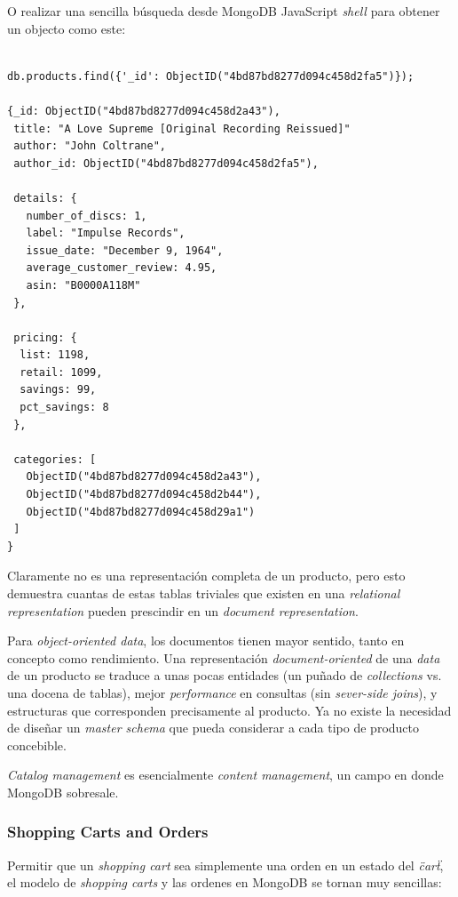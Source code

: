 O realizar una sencilla búsqueda desde MongoDB JavaScript \textit{shell} para obtener un objecto  como este:

\medskip
\begin{lstlisting}[caption= Busqueda en MongoDB]

db.products.find({'_id': ObjectID("4bd87bd8277d094c458d2fa5")});

{_id: ObjectID("4bd87bd8277d094c458d2a43"),
 title: "A Love Supreme [Original Recording Reissued]"
 author: "John Coltrane",
 author_id: ObjectID("4bd87bd8277d094c458d2fa5"),

 details: {
   number_of_discs: 1,
   label: "Impulse Records",
   issue_date: "December 9, 1964",
   average_customer_review: 4.95,
   asin: "B0000A118M"
 },

 pricing: {
  list: 1198,
  retail: 1099,
  savings: 99,
  pct_savings: 8
 },

 categories: [
   ObjectID("4bd87bd8277d094c458d2a43"),
   ObjectID("4bd87bd8277d094c458d2b44"),
   ObjectID("4bd87bd8277d094c458d29a1")
 ]
}
\end{lstlisting}

Claramente no es una representación completa de un producto, pero esto demuestra cuantas de estas tablas triviales que existen en una \textit{relational representation} pueden prescindir en un \textit{document representation}.

Para \textit{object-oriented data}, los documentos tienen mayor sentido, tanto en concepto como rendimiento. Una representación \textit{document-oriented} de una \textit{data} de un producto se traduce a unas pocas entidades (un puñado de \textit{collections} vs. una docena de tablas), mejor \textit{performance} en consultas (sin \textit{sever-side joins}), y estructuras que corresponden precisamente al producto. Ya no existe la necesidad de diseñar un \textit{master schema} que pueda considerar a cada tipo de producto concebible.

\textit{Catalog management} es esencialmente \textit{content management}, un campo en donde MongoDB sobresale.

\subsubsection{Shopping Carts and Orders}

Permitir que un \textit{shopping cart} sea simplemente una orden en un estado del \textit{\"cart\"}, el modelo de \textit{shopping carts} y las ordenes en MongoDB se tornan muy sencillas:

